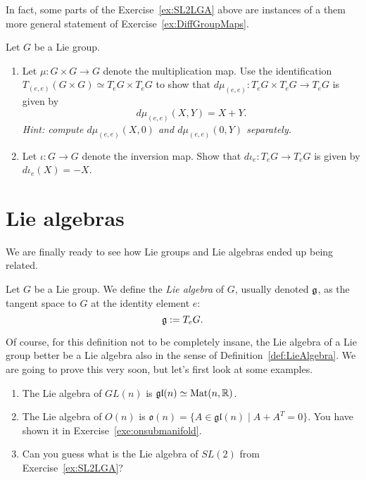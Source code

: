 In fact, some parts of the Exercise~\ref{ex:SL2LGA} above are instances of a them more general statement of Exercise~\ref{ex:DiffGroupMaps}.

\begin{exercise}\label{ex:DiffGroupMaps}
  Let $G$ be a Lie group.
  \begin{enumerate}
    \item Let $\mu:G\times G\to G$ denote the multiplication map.
    Use the identification $T_{(e,e)}(G\times G) \simeq T_eG\times T_eG$ to show that $d\mu_{(e,e)}:T_eG\times T_eG\to T_eG$ is given by
    \begin{equation}
      d\mu_{(e,e)}(X,Y) = X + Y.
    \end{equation}
    \textit{\small Hint: compute $d\mu_{(e,e)}(X,0)$ and $d\mu_{(e,e)}(0,Y)$ separately.}
    \item Let $\iota: G\to G$ denote the inversion map. Show that $d\iota_e:T_eG\to T_eG$ is given by $d\iota_e(X) = -X$.
  \end{enumerate}
\end{exercise}

\section{Lie algebras}

We are finally ready to see how Lie groups and Lie algebras ended up being related.

\begin{definition}
  Let $G$ be a Lie group.
  We define the \emph{Lie algebra} of $G$, usually denoted $\mathfrak{g}$, as the tangent space to $G$ at the identity element $e$:
  \begin{equation}
    \mathfrak{g} := T_e G.
  \end{equation}
\end{definition}

Of course, for this definition not to be completely insane, the Lie algebra of a Lie group better be a Lie algebra also in the sense of Definition~\ref{def:LieAlgebra}.
We are going to prove this very soon, but let's first look at some examples.

\begin{example}
  \begin{enumerate}
    \item The Lie algebra of $GL(n)$ is $\mathfrak{gl}(n)\simeq \mathrm{Mat}(n, \mathbb{R})$.
    \item The Lie algebra of $O(n)$ is $\mathfrak{o}(n) = \{A \in \mathfrak{gl}(n) \mid A+A^T = 0\}$. You have shown it in Exercise~\ref{exe:onsubmanifold}.
    \item Can you guess what is the Lie algebra of $SL(2)$ from Exercise~\ref{ex:SL2LGA}? 
  \end{enumerate}
\end{example}

